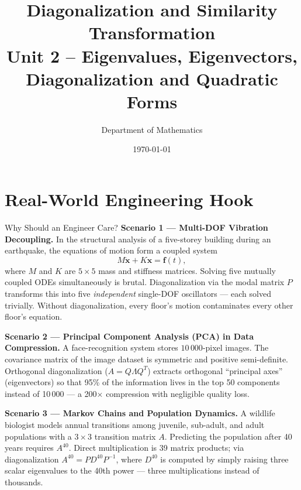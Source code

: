 \documentclass[12pt,a4paper]{article}
\title{\textbf{Diagonalization and Similarity Transformation} \\ \large Unit 2 -- Eigenvalues, Eigenvectors, Diagonalization and Quadratic Forms}
\author{Department of Mathematics}
\date{\today}
\begin{document}
\maketitle
\tableofcontents
\newpage

\section{Real-World Engineering Hook}

\begin{curiositybox}{Why Should an Engineer Care?}
\textbf{Scenario 1 --- Multi-DOF Vibration Decoupling.}
In the structural analysis of a five-storey building during an earthquake, the equations of motion form a coupled system
\[
  M\ddot{\mathbf{x}} + K\mathbf{x} = \mathbf{f}(t),
\]
where $M$ and $K$ are $5\times 5$ mass and stiffness matrices.
Solving five mutually coupled ODEs simultaneously is brutal.
Diagonalization via the modal matrix $P$ transforms this into five \emph{independent} single-DOF oscillators --- each solved trivially.
Without diagonalization, every floor's motion contaminates every other floor's equation.

\textbf{Scenario 2 --- Principal Component Analysis (PCA) in Data Compression.}
A face-recognition system stores $10\,000$-pixel images.
The covariance matrix of the image dataset is symmetric and positive semi-definite.
Orthogonal diagonalization ($A = Q\Lambda Q^{T}$) extracts orthogonal ``principal axes'' (eigenvectors) so that 95\% of the information lives in the top 50 components instead of 10\,000 --- a 200$\times$ compression with negligible quality loss.

\textbf{Scenario 3 --- Markov Chains and Population Dynamics.}
A wildlife biologist models annual transitions among juvenile, sub-adult, and adult populations with a $3\times 3$ transition matrix $A$.
Predicting the population after 40 years requires $A^{40}$.
Direct multiplication is 39 matrix products; via diagonalization $A^{40} = P D^{40} P^{-1}$, where $D^{40}$ is computed by simply raising three scalar eigenvalues to the 40th power --- three multiplications instead of thousands.
\end{curiositybox}

\end{document}
